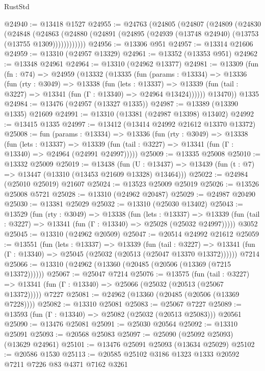 \begin{lexlean}{RustStd}
\begin{coremodule}
@24940 := @13418 @1527
@24955 := @24763
    (@24805
      (@24807
        (@24809
          (@24830
            (@24848
              (@24863
                (@24880 (@24891 (@24895 (@24939 (@13748 @24940) (@13753 (@13755 @1309))))))))))))
@24956 := @13306 @951
@24957 := @13314 @21606
@24959 := @13310 (@24957 @13329)
@24961 := @13352 (@13353 @951)
@24962 := @13348 @24961
@24964 := @13310 (@24962 @13377)
@24981 := @13309
    (fun (fn : @74) =>
    @24959
      (@13332
        (@13335
          (fun (params : @13334) =>
          @13336
            (fun (rty : @3049) =>
            @13338
              (fun (lets : @13337) =>
              @13339 (fun (tail : @3227) => @13341 (fun (Γ : @13340) => @24964 @13424))))))
        @13470))
    @1335
@24984 := @13476 (@24957 (@13327 @1335))
@24987 := @13389 (@13390 @1335) @21609
@24991 := @13310 (@13381 (@24987 @13398) @13402)
@24992 := @13415 @1335
@24997 := @13412 (@13414 @24992 @21612 @13370 @13372)
@25008 := fun (params : @13334) =>
  @13336
    (fun (rty : @3049) =>
    @13338
      (fun (lets : @13337) =>
      @13339 (fun (tail : @3227) => @13341 (fun (Γ : @13340) => @24964 (@24991 @24997)))))
@25009 := @13335 @25008
@25010 := @13332 @25009
@25019 := @13438
    (fun (U : @13437) => @13439 (fun (t : @7) => @13447 (@13310 (@13453 @21609 @13328) @13464)))
@25022 := @24984 (@25010 @25019) @21607
@25024 := @13523 @25009 @25019
@25026 := @13526 @25008 @5721
@25028 := @13310 (@24962 @20487)
@25029 := @24987 @20490
@25030 := @13381 @25029
@25032 := @13310 (@25030 @13402)
@25043 := @13529
    (fun (rty : @3049) =>
    @13338
      (fun (lets : @13337) =>
      @13339 (fun (tail : @3227) => @13341 (fun (Γ : @13340) => @25028 (@25032 @24997)))))
    @3052
@25045 := @13310 (@24962 @20509)
@25047 := @20514 @24992 @21612
@25059 := @13551
    (fun (lets : @13337) =>
    @13339
      (fun (tail : @3227) =>
      @13341 (fun (Γ : @13340) => @25045 (@25032 (@20513 (@25047 @13370 @13372))))))
    @7214
@25066 := @13310 (@24962 (@13360 (@20485 (@20506 (@13369 (@7215 @13372))))))
@25067 := @25047 @7214
@25076 := @13575
    (fun (tail : @3227) => @13341 (fun (Γ : @13340) => @25066 (@25032 (@20513 (@25067 @13372)))))
    @7227
@25081 := @24962 (@13360 (@20485 (@20506 (@13369 @7228))))
@25082 := @13310 @25081
@25083 := @25067 @7227
@25089 := @13593 (fun (Γ : @13340) => @25082 (@25032 (@20513 @25083))) @20561
@25090 := @13476 @25081
@25091 := @25030 @20564
@25092 := @13310 @25091
@25093 := @20568 @25083
@25097 := @25090 (@25092 @25093) (@13629 @24961)
@25101 := @13476 @25091 @25093 (@13634 @25029)
@25102 := @20586 @1530
@25113 := @20585 @25102 @3186 @1323 @1333 @20592 @7211 @7226 @83 @4371 @7162 @3261

\end{coremodule}
\end{lexlean}
